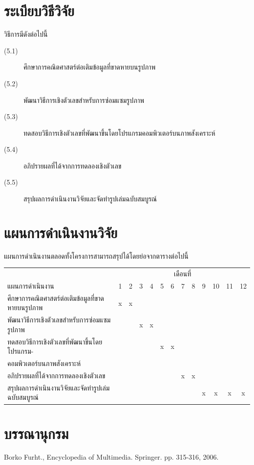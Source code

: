 \documentclass[hidelinks,a4paper,14pt]{article}
\numberwithin{equation}{section}							%
\begin{document}
{\section{ระเบียบวิธีวิจัย}
วิธีการมีดังต่อไปนี้
\begin{description}
	\item[(5.1)] ศึกษาการคณิตศาสตร์ต่อเติมข้อมูลที่ขาดหายบนรูปภาพ
	\item[(5.2)] พัฒนาวิธีการเชิงตัวเลขสำหรับการซ่อมแซมรูปภาพ
	\item[(5.3)] ทดสอบวิธีการเชิงตัวเลขที่พัฒนาขึ้นโดยโปรแกรมคอมพิวเตอร์บนภาพสังเคราะห์
	\item[(5.4)] อภิปรายผลที่ได้จากการทดลองเชิงตัวเลข
	\item[(5.5)] สรุปผลการดำเนินงานวิจัยและจัดทำรูปเล่มฉบับสมบูรณ์
\end{description}

\section{แผนการดำเนินงานวิจัย}
แผนการดำเนินงานตลอดทั้งโครงการสามารถสรุปได้โดยย่อจากตารางต่อไปนี้
\begin{center}
	\begin{tabular}[ht]{|l|c|c|c|c|c|c|c|c|c|c|c|c|}
		\hline
		&\multicolumn{12}{c|}{เดือนที่}\\
		\cline{2-13}
		แผนการดำเนินงาน&1&2&3&4&5&6&7&8&9&10&11&12\\
		\hline
		ศึกษาการคณิตศาสตร์ต่อเติมข้อมูลที่ขาดหายบนรูปภาพ&x&x& & & & & & & & & &\\
		พัฒนาวิธีการเชิงตัวเลขสำหรับการซ่อมแซมรูปภาพ& & &x&x& & & & & & & &\\
		ทดสอบวิธีการเชิงตัวเลขที่พัฒนาขึ้นโดยโปรแกรม- & & & & &x&x& & & & & &\\
		คอมพิวเตอร์บนภาพสังเคราะห์ & & & & & & & & & & & &\\
		อภิปรายผลที่ได้จากการทดลองเชิงตัวเลข & & & & & & &x&x& & & &\\
		สรุปผลการดำเนินงานวิจัยและจัดทำรูปเล่มฉบับสมบูรณ์& & & & & & & & &x&x&x&x\\
		\hline
	\end{tabular}
\end{center}



\section{บรรณานุกรม}

\renewcommand{\section}[2]{} %
\begin{thebibliography}{}
	Borko Furht., Encyclopedia of Multimedia. Springer. pp. 315-316, 2006. %
	

\end{thebibliography}}
\end{document}

